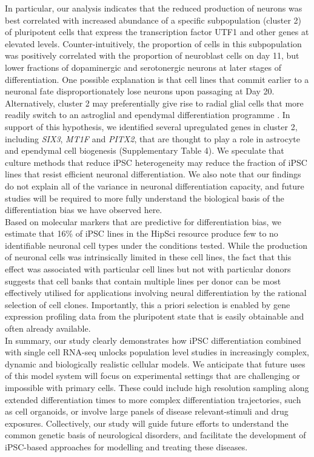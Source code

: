 In particular, our analysis indicates that the reduced production of neurons was best
correlated with increased abundance of a specific subpopulation (cluster 2) of pluripotent cells that express the transcription factor UTF1 and other genes at elevated levels.
Counter-intuitively, the proportion of cells in this subpopulation was positively correlated with the proportion of neuroblast cells on day 11, but lower fractions of dopaminergic and serotonergic neurons at later stages of differentiation. One possible explanation is that cell lines that commit earlier to a neuronal fate disproportionately lose neurons upon passaging at Day 20. 
Alternatively, cluster 2 may preferentially give rise to radial glial cells that more readily switch to an astroglial and ependymal differentiation programme \cite{spassky2005adult}. 
In support of this hypothesis, we identified several upregulated genes in cluster 2, including \textit{SIX3}, \textit{MT1F} and \textit{PITX2}, that are thought to play a role in astrocyte and ependymal cell biogenesis \cite{lavado2011six3, michael2011up, jacquet2009foxj1} (Supplementary Table 4). 
We speculate that culture methods that reduce iPSC heterogeneity may reduce the fraction of iPSC lines that resist efficient neuronal differentiation. 
We also note that our findings do not explain all of the variance in neuronal differentiation capacity, and future studies will be required to more fully understand the biological basis of the differentiation bias we have observed here.\\

Based on molecular markers that are predictive for differentiation bias, we estimate that 16\% of iPSC lines in the HipSci resource produce few to no identifiable neuronal cell types under the conditions tested. 
While the production of neuronal cells was intrinsically limited in these cell lines, the fact that this effect was associated with particular cell lines but not with particular donors suggests that cell banks that contain multiple lines per donor can be most effectively utilised for applications involving neural differentiation by the rational selection of cell clones. 
Importantly, this a priori selection is enabled by gene expression profiling data from the pluripotent state that is easily obtainable and often already available.\\

In summary, our study clearly demonstrates how iPSC differentiation combined with single cell RNA-seq unlocks population level studies in increasingly complex, dynamic and biologically realistic cellular models. We anticipate that future uses of this model system will focus on experimental settings that are challenging or impossible with primary cells. 
These could include high resolution sampling along extended differentiation times to more complex differentiation trajectories, such as cell organoids, or involve large panels of disease relevant-stimuli and drug exposures. 
Collectively, our study will guide future efforts to understand the common genetic basis of neurological disorders, and facilitate the development of iPSC-based approaches for modelling and treating these diseases.